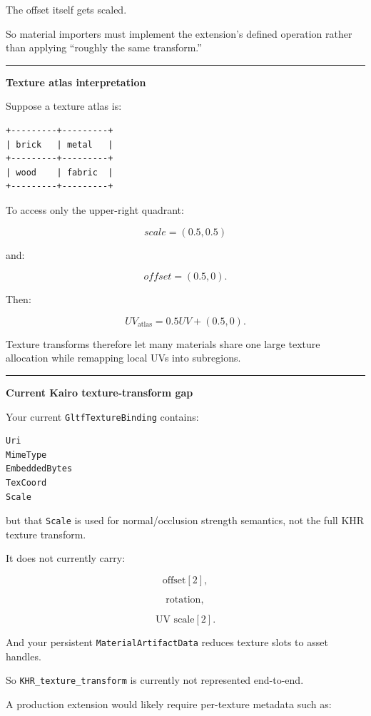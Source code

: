 The offset itself gets scaled.

So material importers must implement the extension's defined operation rather than applying ``roughly the same transform.''

\begin{center}\rule{0.5\linewidth}{0.5pt}\end{center}

\textbf{Texture atlas interpretation}

Suppose a texture atlas is:

\begin{verbatim}
+---------+---------+
| brick   | metal   |
+---------+---------+
| wood    | fabric  |
+---------+---------+
\end{verbatim}

To access only the upper-right quadrant:

\[
scale=(0.5,0.5)
\]

and:

\[
offset=(0.5,0).
\]

Then:

\[
UV_{\text{atlas}}
=
0.5UV+
(0.5,0).
\]

Texture transforms therefore let many materials share one large texture allocation while remapping local UVs into subregions.

\begin{center}\rule{0.5\linewidth}{0.5pt}\end{center}

\textbf{Current Kairo texture-transform gap}

Your current \texttt{GltfTextureBinding} contains:

\begin{verbatim}
Uri
MimeType
EmbeddedBytes
TexCoord
Scale
\end{verbatim}

but that \texttt{Scale} is used for normal/occlusion strength semantics, not the full KHR texture transform.

It does not currently carry:

\[
\text{offset}[2],
\]

\[
\text{rotation},
\]

\[
\text{UV scale}[2].
\]

And your persistent \texttt{MaterialArtifactData} reduces texture slots to asset handles.

So \texttt{KHR\_texture\_transform} is currently not represented end-to-end.

A production extension would likely require per-texture metadata such as:

